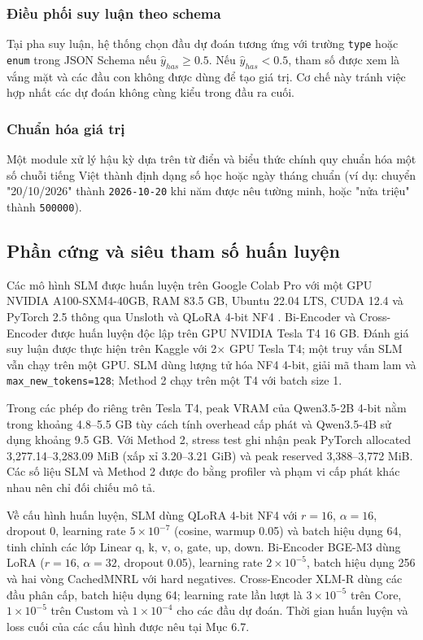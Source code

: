 \documentclass[10pt,twocolumn,a4paper]{article}
\begin{document}
\subsubsection{Điều phối suy luận theo schema}
Tại pha suy luận, hệ thống chọn đầu dự đoán tương ứng với trường \texttt{type} hoặc \texttt{enum} trong JSON Schema nếu $\hat{y}_{has} \geq 0.5$. Nếu $\hat{y}_{has} < 0.5$, tham số được xem là vắng mặt và các đầu con không được dùng để tạo giá trị. Cơ chế này tránh việc hợp nhất các dự đoán không cùng kiểu trong đầu ra cuối.

\subsubsection{Chuẩn hóa giá trị}
Một module xử lý hậu kỳ dựa trên từ điển và biểu thức chính quy chuẩn hóa một số chuỗi tiếng Việt thành định dạng số học hoặc ngày tháng chuẩn (ví dụ: chuyển "20/10/2026" thành \texttt{2026-10-20} khi năm được nêu tường minh, hoặc "nửa triệu" thành \texttt{500000}).


\subsection{Phần cứng và siêu tham số huấn luyện}

Các mô hình SLM được huấn luyện trên Google Colab Pro với một GPU NVIDIA A100-SXM4-40GB, RAM 83.5 GB, Ubuntu 22.04 LTS, CUDA 12.4 và PyTorch 2.5 thông qua Unsloth và QLoRA 4-bit NF4 \cite{dettmers2023qlora}. Bi-Encoder và Cross-Encoder được huấn luyện độc lập trên GPU NVIDIA Tesla T4 16 GB. Đánh giá suy luận được thực hiện trên Kaggle với 2$\times$ GPU Tesla T4; một truy vấn SLM vẫn chạy trên một GPU. SLM dùng lượng tử hóa NF4 4-bit, giải mã tham lam và \texttt{max\_new\_tokens=128}; Method 2 chạy trên một T4 với batch size 1.

Trong các phép đo riêng trên Tesla T4, peak VRAM của Qwen3.5-2B 4-bit nằm trong khoảng 4.8--5.5 GB tùy cách tính overhead cấp phát và Qwen3.5-4B sử dụng khoảng 9.5 GB. Với Method 2, stress test ghi nhận peak PyTorch allocated 3,277.14--3,283.09 MiB (xấp xỉ 3.20--3.21 GiB) và peak reserved 3,388--3,772 MiB. Các số liệu SLM và Method 2 được đo bằng profiler và phạm vi cấp phát khác nhau nên chỉ đối chiếu mô tả.

Về cấu hình huấn luyện, SLM dùng QLoRA 4-bit NF4 với $r=16$, $\alpha=16$, dropout 0, learning rate $5\times10^{-7}$ (cosine, warmup 0.05) và batch hiệu dụng 64, tinh chỉnh các lớp Linear q, k, v, o, gate, up, down. Bi-Encoder BGE-M3 dùng LoRA ($r=16$, $\alpha=32$, dropout 0.05), learning rate $2\times10^{-5}$, batch hiệu dụng 256 và hai vòng CachedMNRL với hard negatives. Cross-Encoder XLM-R dùng các đầu phân cấp, batch hiệu dụng 64; learning rate lần lượt là $3\times10^{-5}$ trên Core, $1\times10^{-5}$ trên Custom và $1\times10^{-4}$ cho các đầu dự đoán. Thời gian huấn luyện và loss cuối của các cấu hình được nêu tại Mục 6.7.
\end{document}
